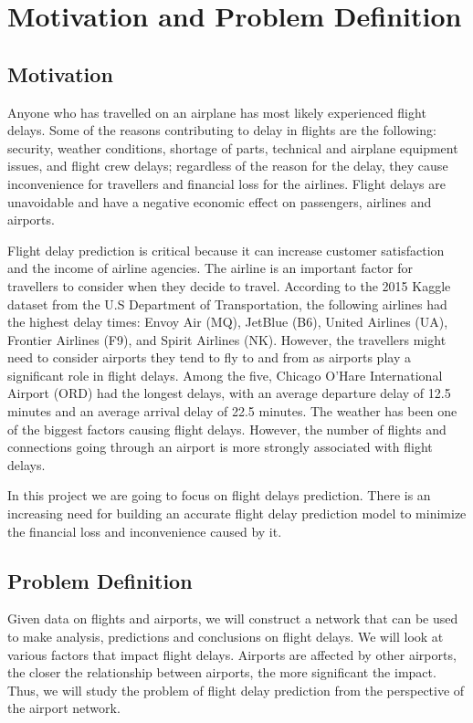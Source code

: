 \documentclass[sigconf,nonacm]{acmart}
\begin{document}
\section{Motivation and Problem Definition}

\subsection{Motivation}
Anyone who has travelled on an airplane has most likely experienced flight delays. Some of the reasons contributing to delay in flights are the following: security, weather conditions, shortage of parts, technical and airplane equipment issues, and flight crew delays; regardless of the reason for the delay, they cause inconvenience for travellers and financial loss for the airlines. Flight delays are unavoidable and have a negative economic effect on passengers, airlines and airports. 


Flight delay prediction is critical because it can increase customer satisfaction and the income of airline agencies. The airline is an important factor for travellers to consider when they decide to travel. According to the 2015 Kaggle dataset from the U.S Department of Transportation, the following airlines had the highest delay times: Envoy Air (MQ), JetBlue (B6), United Airlines (UA), Frontier Airlines (F9), and Spirit Airlines (NK). However, the travellers might need to consider airports they tend to fly to and from as airports play a significant role in flight delays. Among the five, Chicago O'Hare International Airport (ORD) had the longest delays, with an average departure delay of 12.5 minutes and an average arrival delay of 22.5 minutes. The weather has been one of the biggest factors causing flight delays. However, the number of flights and connections going through an airport is more strongly associated with flight delays.  


In this project we are going to focus on flight delays prediction. There is an increasing need for building an accurate flight delay prediction model to minimize the financial loss and inconvenience caused by it. 

\subsection{Problem Definition}
Given data on flights and airports, we will construct a network that can be used to make analysis, predictions and conclusions on flight delays. We will look at various factors that impact flight delays. Airports are affected by other airports, the closer the relationship between airports, the more significant the impact\cite{Zeng2021}. Thus, we will study the problem of flight delay prediction from the perspective of the airport network.
\end{document}
